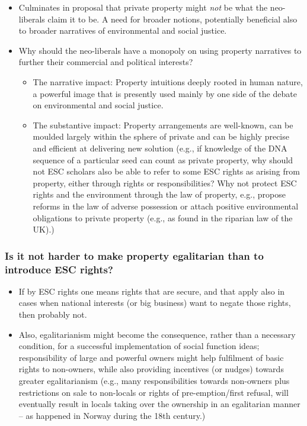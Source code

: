\documentclass{beamer}
\begin{document}
\begin{frame}
\begin{itemize}
\item Culminates in proposal that private property might {\it not} be what the neo-liberals claim it to be. A need for broader notions, potentially beneficial also to broader narratives of environmental and social justice.
\item Why should the neo-liberals have a monopoly on using property narratives to further their commercial and political interests? 
\begin{itemize}
\item The narrative impact: Property intuitions deeply rooted in human nature, a powerful image that is presently used mainly by one side of the debate on environmental and social justice.
\item The substantive impact: Property arrangements are well-known, can be moulded largely within the sphere of private and can be highly precise and efficient at delivering new solution (e.g., if knowledge of the DNA sequence of a particular seed can count as private property, why should not ESC scholars also be able to refer to some ESC rights as arising from property, either through rights or responsibilities? Why not protect ESC rights and the environment through the law of property, e.g., propose reforms in the law of adverse possession or attach positive environmental obligations to private property (e.g., as found in the riparian law of the UK).)
\end{itemize}
\end{itemize}
\end{frame}

\begin{frame}

\frametitle{Is it not harder to make property egalitarian than to introduce ESC rights?}
\begin{itemize}
\item If by ESC rights one means rights that are secure, and that apply also in cases when national interests (or big business) want to negate those rights, then probably not.
\item Also, egalitarianism might become the consequence, rather than a necessary condition, for a successful implementation of social function ideas; responsibility of large and powerful owners might 
help fulfilment of basic rights to non-owners, while also providing incentives (or nudges) towards greater egalitarianism (e.g., many responsibilities towards non-owners plus restrictions on sale to non-locals or rights of pre-emption/first refusal, will eventually result in locals taking over the ownership in an egalitarian manner -- as happened in Norway during the 18th century.)
\end{itemize}
\end{frame}
\end{document}
